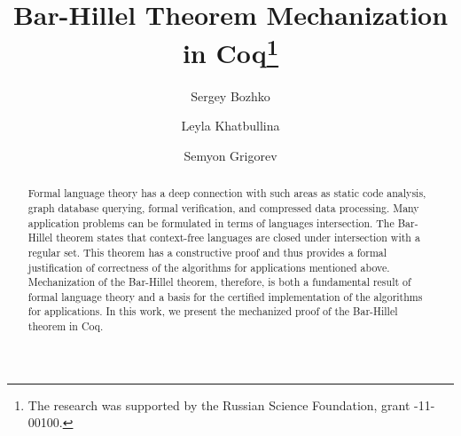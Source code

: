 \documentclass[runningheads]{llncs}
\begin{document}
%
\title{Bar-Hillel Theorem Mechanization in Coq\thanks{The research was supported by the Russian Science Foundation, grant -11-00100.}}
%
%
\author{Sergey Bozhko \and
Leyla Khatbullina \and
Semyon Grigorev}
%
%
%
\maketitle              %
%
\begin{abstract}
Formal language theory has a deep connection with such areas as static code analysis, graph database querying, formal verification, and compressed data processing.
Many application problems can be formulated in terms of languages intersection.
The Bar-Hillel theorem states that context-free languages are closed under intersection with a regular set.
This theorem has a constructive proof and thus provides a formal justification of correctness of the algorithms for applications mentioned above.
Mechanization of the Bar-Hillel theorem, therefore, is both a fundamental result of formal language theory and a basis for the certified implementation of the algorithms for applications.
In this work, we present the mechanized proof of the Bar-Hillel theorem in Coq.

\end{abstract}
%
%
%


%




%
%
%
 
 
%
\appendix

\end{document}
